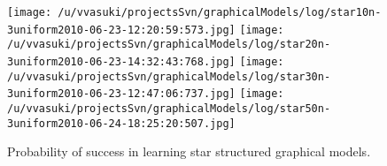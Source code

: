 \documentclass[oneside, article]{memoir}
\begin{document}
\begin{figure}[h]
 \texttt{[image: /u/vvasuki/projectsSvn/graphicalModels/log/star10n-3uniform2010-06-23-12:20:59:573.jpg]}
 \texttt{[image: /u/vvasuki/projectsSvn/graphicalModels/log/star20n-3uniform2010-06-23-14:32:43:768.jpg]}
 \texttt{[image: /u/vvasuki/projectsSvn/graphicalModels/log/star30n-3uniform2010-06-23-12:47:06:737.jpg]}
 \texttt{[image: /u/vvasuki/projectsSvn/graphicalModels/log/star50n-3uniform2010-06-24-18:25:20:507.jpg]}
 \caption{Probability of success in learning star structured graphical models.}
 \label{fig:starStructureLearning}
\end{figure}



% 
% 
\end{document}
